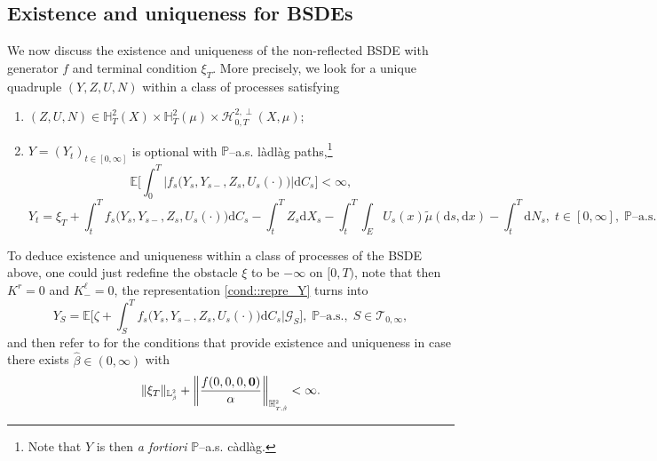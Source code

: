 \documentclass[10pt]{article} %
\newcommand\cG{\mathcal G}
\newcommand\cH{\mathcal H}
\newcommand\cT{\mathcal T}
\newcommand{\smalltext}[1]{\text{\fontsize{4}{4}\selectfont$#1$}}
\def \E{\mathbb{E}}
\def \H{\mathbb{H}}
\def \L{\mathbb{L}}
\def \P{\mathbb{P}}
\newcommand{\1}{\mathbf{1}}
\def\d{\mathrm{d}}
\begin{document}
\subsection{Existence and uniqueness for BSDEs}\label{sec::main_results_bsde}

We now discuss the existence and uniqueness of the non-reflected BSDE with generator $f$ and terminal condition $\xi_T$. More precisely, we look for a unique quadruple $(Y,Z,U,N)$ within a class of processes satisfying
\begin{enumerate}[{\bf (B1)}, leftmargin=0.9cm]
	\item\label{BSDE1} $(Z,U,N) \in \H^2_T(X) \times \H^2_T(\mu) \times \cH^{2,\perp}_{0,T}(X,\mu)$;
	\item\label{BSDE2} $Y = (Y_t)_{t \in [0,\infty]}$ is optional with $\P$--a.s. l\`adl\`ag paths,\footnote{Note that $Y$ is then \emph{a fortiori} $\mathbb{P}$--a.s. c\`adl\`ag.}
		\begin{equation*}
			\E\bigg[\int_0^T \big|f_s\big(Y_s,Y_{s-},Z_s,U_s(\cdot)\big)\big|\d C_s\bigg] < \infty,
		\end{equation*}
		\begin{equation*}
			Y_t = \xi_T + \int_t^T f_s\big(Y_s,Y_{s-},Z_s,U_s(\cdot)\big) \d C_s - \int_t^T Z_s \d X_s - \int_t^T \int_E U_s(x)\tilde\mu(\d s, \d x) - \int_t^T \d N_s, \; t \in [0,\infty], \; \text{$\P$--a.s.}
		\end{equation*}
\end{enumerate}
To deduce existence and uniqueness within a class of processes of the BSDE above, one could just redefine the obstacle $\xi$ to be $-\infty$ on $[0,T)$, note that then $K^r = 0$ and $K^\ell_{-} = 0$, the representation \ref{cond::repre_Y} turns into
\begin{equation*}
	Y_S = \E\bigg[\zeta + \int_S^T f_s\big(Y_s,Y_{s-},Z_s,U_s(\cdot)\big)\d C_s\bigg| \cG_S\bigg], \; \text{$\P$--a.s.}, \; S \in \cT_{0,\infty},
\end{equation*}
and then refer to  for the conditions that provide existence and uniqueness in case there exists $\hat\beta \in (0,\infty)$ with
\begin{equation}\label{eq::integrability_bsde}
	\|\xi_T\|_{\L^\smalltext{2}_\smalltext{\hat\beta}} + \bigg\|\frac{f(0,0,0,\mathbf{0})}{\alpha}\bigg\|_{\H^\smalltext{2}_{\smalltext{T}\smalltext{,}\smalltext{\hat\beta}}} < \infty.
\end{equation}
\end{document}
